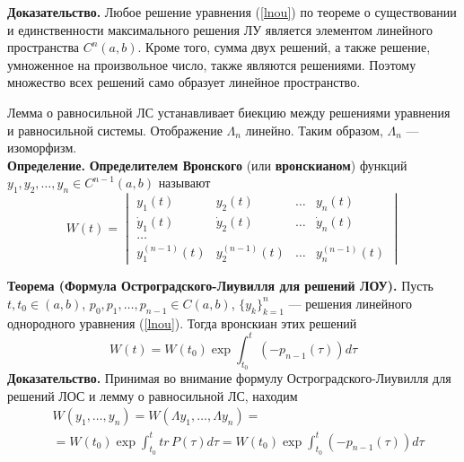 \noindent \textbf{Доказательство.} Любое решение уравнения (\ref{lnou}) по теореме о существовании и единственности максимального решения ЛУ является элементом линейного пространства $C^n(a,b)$. Кроме того, сумма двух решений, а также решение, умноженное на произвольное число, также являются решениями. Поэтому множество всех решений само образует линейное пространство.

Лемма о равносильной ЛС устанавливает биекцию между решениями уравнения и равносильной системы. Отображение $\Lambda_n$ линейно. Таким образом, $\Lambda_n$ --- изоморфизм.\\

\noindent \textbf{Определение.} \textbf{Определителем Вронского} (или \textbf{вронскианом}) функций $y_1, y_2, \ldots, y_n \in C^{n-1}(a,b)$ называют
\begin{equation*}
    W(t) = \begin{vmatrix}
    y_1(t) & y_2(t) & \ldots & y_n(t)\\
    \dot{y}_1(t) & \dot{y}_2(t) & \ldots & \dot{y}_n(t)\\
    \ldots\\
    y_1^{(n-1)}(t) & y_2^{(n-1)}(t) & \ldots & y_n^{(n-1)}(t)
    \end{vmatrix}
\end{equation*}

\noindent \textbf{Теорема (Формула Остроградского-Лиувилля для решений ЛОУ).} Пусть $t, t_0 \in (a,b)$, $p_0, p_1, \ldots, p_{n-1} \in C(a,b)$, $\{y_k\}_{k=1}^n$ --- решения линейного однородного уравнения (\ref{lnou}). Тогда вронскиан этих решений
\begin{equation*}
    W(t) = W(t_0)\exp \int_{t_0}^t (-p_{n-1}(\tau))d\tau
\end{equation*}
\textbf{Доказательство.} Принимая во внимание формулу Остроградского-Лиувилля для решений ЛОС и лемму о равносильной ЛС, находим
\begin{equation*}
    \begin{aligned}
        &W(y_1,\ldots, y_n) = W(\Lambda y_1,\ldots, \Lambda y_n) =\\
        &= W(t_0)\exp \int_{t_0}^t tr\,P(\tau)d\tau = W(t_0)\exp \int_{t_0}^t (-p_{n-1}(\tau))d\tau 
    \end{aligned}
\end{equation*}

